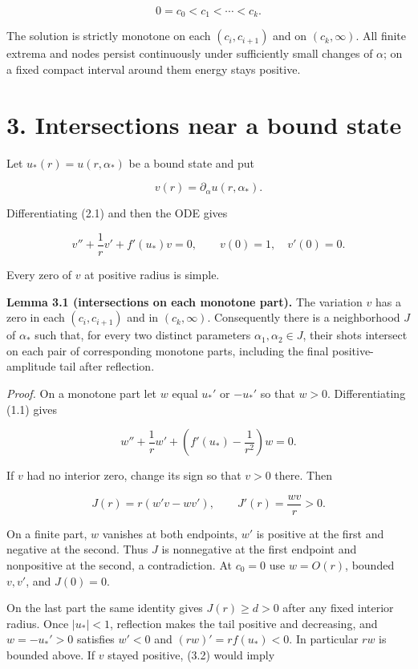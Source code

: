 \documentclass[11pt]{article}
\begin{document}
\[0=c_0<c_1<\cdots<c_k.\]

The solution is strictly monotone on each \((c_i,c_{i+1})\) and on
\((c_k,\infty)\). All finite extrema and nodes persist continuously
under sufficiently small changes of \(\alpha\); on a fixed compact
interval around them energy stays positive.

\section{3. Intersections near a bound
state}\label{intersections-near-a-bound-state}

Let \(u_*(r)=u(r,\alpha_*)\) be a bound state and put

\[v(r)=\partial_\alpha u(r,\alpha_*) .\]

Differentiating (2.1) and then the ODE gives

\[v''+\frac1r v'+f'(u_*)v=0,\qquad v(0)=1,\quad v'(0)=0. \tag{3.1}\]

Every zero of \(v\) at positive radius is simple.

\textbf{Lemma 3.1 (intersections on each monotone part).} The variation
\(v\) has a zero in each \((c_i,c_{i+1})\) and in \((c_k,\infty)\).
Consequently there is a neighborhood \(J\) of \(\alpha_*\) such that,
for every two distinct parameters \(\alpha_1,\alpha_2\in J\), their
shots intersect on each pair of corresponding monotone parts, including
the final positive-amplitude tail after reflection.

\emph{Proof.} On a monotone part let \(w\) equal \(u_*'\) or \(-u_*'\)
so that \(w>0\). Differentiating (1.1) gives

\[w''+\frac1r w'+\left(f'(u_*)-\frac1{r^2}\right)w=0.\]

If \(v\) had no interior zero, change its sign so that \(v>0\) there.
Then

\[J(r)=r(w'v-wv'),\qquad J'(r)=\frac{wv}{r}>0. \tag{3.2}\]

On a finite part, \(w\) vanishes at both endpoints, \(w'\) is positive
at the first and negative at the second. Thus \(J\) is nonnegative at
the first endpoint and nonpositive at the second, a contradiction. At
\(c_0=0\) use \(w=O(r)\), bounded \(v,v'\), and \(J(0)=0\).

On the last part the same identity gives \(J(r)\geq d>0\) after any
fixed interior radius. Once \(|u_*|<1\), reflection makes the tail
positive and decreasing, and \(w=-u_*'>0\) satisfies \(w'<0\) and
\((rw)'=rf(u_*)<0\). In particular \(rw\) is bounded above. If \(v\)
stayed positive, (3.2) would imply
\end{document}
